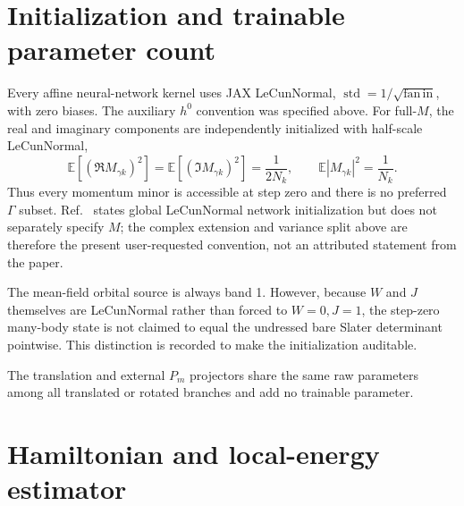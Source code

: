\section{Initialization and trainable parameter count}

Every affine neural-network kernel uses JAX LeCunNormal,
$\operatorname{std}=1/\sqrt{\mathrm{fan\,in}}$, with zero biases.
The auxiliary $h^0$ convention was specified above. For full-$M$, the real and
imaginary components are independently initialized with half-scale
LeCunNormal,
\begin{equation}
 \mathbb E[(\Re M_{\gamma k})^2]
 =\mathbb E[(\Im M_{\gamma k})^2]=\frac{1}{2N_k},
 \qquad \mathbb E|M_{\gamma k}|^2=\frac1{N_k}.
\end{equation}
Thus every momentum minor is accessible at step zero and there is no preferred
$\Gamma$ subset. Ref.~\cite{luo} states global LeCunNormal network
initialization but does not separately specify $M$; the complex extension and
variance split above are therefore the present user-requested convention, not
an attributed statement from the paper.

The mean-field orbital source is always band 1. However, because $W$ and
$J$ themselves are LeCunNormal rather than forced to $W=0,J=1$, the step-zero
many-body state is not claimed to equal the undressed bare Slater determinant
pointwise. This distinction is recorded to make the initialization auditable.

\begin{table}[H]
\centering
\caption{Trainable real parameter counts. Version 5 uses the same single
complex $N_e\times9$ matrix $M$ as full $M$; finite-group projections add no
parameters.}
\label{tab:strictparams}
\end{table}
The translation and external $P_m$ projectors share the same raw parameters
among all translated or rotated branches and add no trainable parameter.

\section{Hamiltonian and local-energy estimator}

